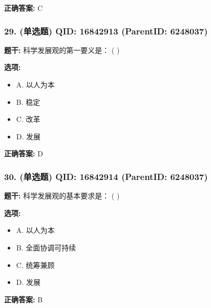 \documentclass[12pt,UTF8]{ctexart}
\begin{document}
\textbf{正确答案:}
C

\vspace{0.3em}\hrulefill\vspace{0.7em}

\subsubsection*{29. (单选题) \small QID: 16842913 (ParentID: 6248037)}

\textbf{题干:}
科学发展观的第一要义是： ( )



\textbf{选项:}
\begin{itemize}[leftmargin=*]

  \item A. 以人为本

  \item B. 稳定

  \item C. 改革

  \item D. 发展

\end{itemize}

\textbf{正确答案:}
D

\vspace{0.3em}\hrulefill\vspace{0.7em}

\subsubsection*{30. (单选题) \small QID: 16842914 (ParentID: 6248037)}

\textbf{题干:}
科学发展观的基本要求是： ( )



\textbf{选项:}
\begin{itemize}[leftmargin=*]

  \item A. 以人为本

  \item B. 全面协调可持续

  \item C. 统筹兼顾

  \item D. 发展

\end{itemize}

\textbf{正确答案:}
B

\vspace{0.3em}\hrulefill\vspace{0.7em}
\end{document}

